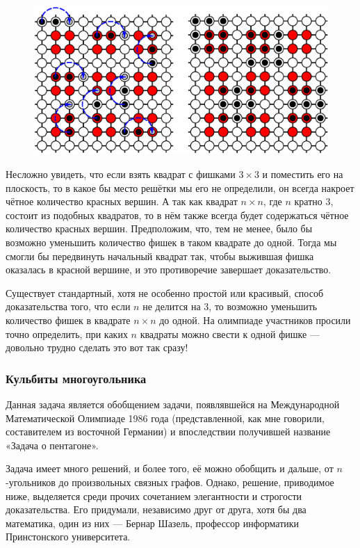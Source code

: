 \begin{figure}[h!]
\centering
\includegraphics[scale=0.5]{Figs/Algorithms/square}
\end{figure}

Несложно увидеть, что если взять квадрат с фишками $3\times 3$ и поместить его на плоскость, то в какое бы место решётки мы его не определили, он всегда накроет чётное количество красных вершин.
А так как квадрат $n\times n$, где $n$ кратно $3$, состоит из подобных квадратов, то в нём также всегда будет содержаться чётное количество красных вершин.
Предположим, что, тем не менее, было бы возможно уменьшить количество фишек в таком квадрате до одной.
Тогда мы смогли бы передвинуть начальный квадрат так, чтобы выжившая фишка оказалась в красной вершине, и это противоречие завершает доказательство.
\heart

Существует стандартный, хотя не особенно простой или красивый, %
способ доказательства того, что если $n$ не делится на $3$, то возможно уменьшить количество фишек в квадрате $n\times n$ до одной.
На олимпиаде участников просили точно определить, при каких $n$ квадраты можно свести к одной фишке --- довольно трудно сделать это вот так сразу!

\subsubsection*{Кульбиты многоугольника}%

Данная задача является обобщением задачи, появлявшейся на Международной Математической Олимпиаде 1986 года (представленной, как мне говорили, составителем из восточной Германии) и впоследствии получившей название «Задача о пентагоне».

Задача имеет много решений, и более того, её можно обобщить и дальше, от $n$-угольников до произвольных связных графов.
Однако, решение, приводимое ниже, выделяется среди прочих сочетанием элегантности и строгости доказательства.
Его придумали, независимо друг от друга, хотя бы два математика, один из них --- Бернар Шазель, профессор информатики Принстонского университета. %


